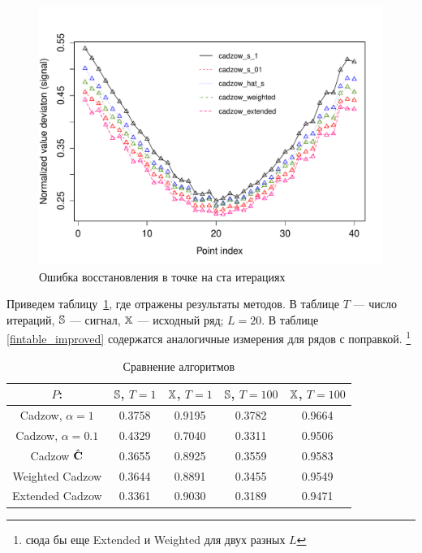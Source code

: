 \documentclass[12pt,a4paper,fleqn,leqno]{article}
\begin{document}
\begin{figure}[!hhh] 
\begin{center}
\includegraphics[width = 15cm]{s1_it100.pdf}
\caption{Ошибка восстановления в точке на ста итерациях}
\label{fig:s1_it100}
\end{center}
\end{figure}


Приведем таблицу~\ref{fintable}, где отражены результаты методов.
В таблице $T$ --- число итераций, $\mathbb{S}$ --- сигнал, $\mathbb{X}$ --- исходный ряд; $L=20$. В таблице \ref{fintable_improved} содержатся аналогичные измерения для рядов с поправкой. 
\footnote{сюда бы еще Extended и Weighted для двух разных $L$}

\begin{table}[!hhh]
\begin{center}
\caption{Сравнение алгоритмов}\label{fintable}
\begin{tabular}{|c|c|c|c|c|}
\hline
$P$: & $\mathbb{S}$, $T = 1$ & $\mathbb{X}$, $T = 1$ & $\mathbb{S}$, $T = 100$ & $\mathbb{X}$, $T = 100$  \\
\hline
Cadzow, $\alpha = 1$ & 0.3758 & 0.9195 & 0.3782 & 0.9664 \\
\hline
Cadzow, $\alpha = 0.1$ & 0.4329 & 0.7040 & 0.3311 & 0.9506 \\
\hline
Cadzow $\hat{\mathbf{C}}$ & 0.3655 & 0.8925 & 0.3559 & 0.9583 \\
\hline
Weighted Cadzow & 0.3644 & 0.8891 & 0.3455 & 0.9549 \\
\hline
Extended Cadzow & 0.3361 & 0.9030 & 0.3189 & 0.9471 \\
\hline
\end{tabular}
\end{center}
\end{table}
\end{document}

